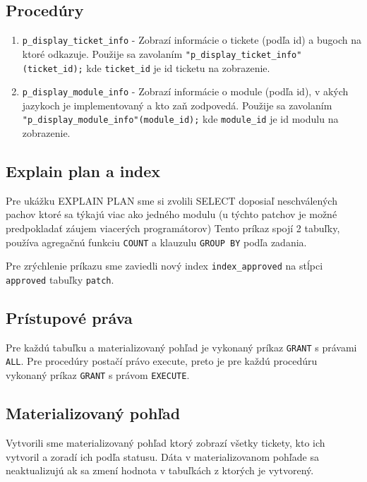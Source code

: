 \documentclass[11pt, a4paper]{article}
\begin{document}
    \subsection{Procedúry}\label{subsec:procedúry}

    \begin{enumerate}
        \item \texttt{p\_display\_ticket\_info} -
        Zobrazí informácie o tickete (podľa id) a bugoch na ktoré odkazuje.
        Použije sa zavolaním \texttt{"p\_display\_ticket\_info"(ticket\_id);} kde \texttt{ticket\_id} je id ticketu na zobrazenie.

        \item \texttt{p\_display\_module\_info} -
        Zobrazí informácie o module (podľa id), v akých jazykoch je implementovaný a kto zaň zodpovedá.
        Použije sa zavolaním \texttt{"p\_display\_module\_info"(module\_id);} kde \texttt{module\_id} je id modulu na zobrazenie.
    \end{enumerate}

    \subsection{Explain plan a index}\label{subsec:explain-plan-+-index}

    Pre ukážku EXPLAIN PLAN sme si zvolili SELECT doposiaľ neschválených pachov ktoré sa týkajú viac ako jedného modulu (u týchto patchov je možné predpokladať záujem viacerých programátorov)
    Tento príkaz spojí 2 tabuľky, používa agregačnú funkciu \texttt{COUNT} a klauzulu \texttt{GROUP BY} podľa zadania.

    Pre zrýchlenie príkazu sme zaviedli nový index \texttt{index\_approved} na stĺpci \texttt{approved} tabuľky \texttt{patch}.

    \subsection{Prístupové práva}\label{subsec:prístupové-práva}

    Pre každú tabuľku a materializovaný pohľad je vykonaný príkaz \texttt{GRANT} s právami \texttt{ALL}.
    Pre procedúry postačí právo execute, preto je pre každú procedúru vykonaný príkaz \texttt{GRANT} s právom \texttt{EXECUTE}.

    \subsection{Materializovaný pohľad}\label{subsec:materializovaný-pohľad}

    Vytvorili sme materializovaný pohľad ktorý zobrazí všetky tickety, kto ich vytvoril a zoradí ich podľa statusu.
    Dáta v materializovanom pohľade sa neaktualizujú ak sa zmení hodnota v tabuľkách z ktorých je vytvorený.
\end{document}
